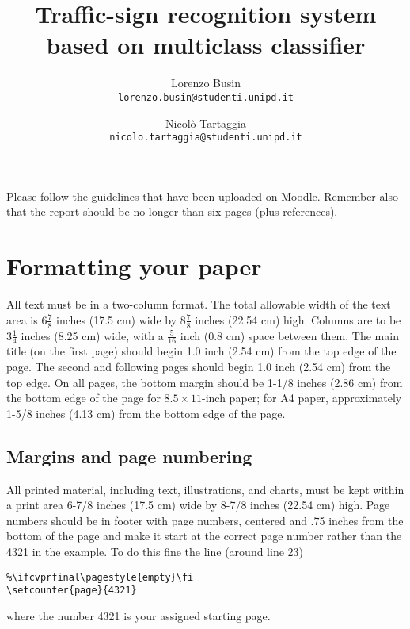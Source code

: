 \documentclass[10pt,twocolumn,letterpaper]{article}
\begin{document}
\title{Traffic-sign recognition system based on multiclass classifier}

\author{Lorenzo Busin\\
{\tt\small lorenzo.busin@studenti.unipd.it}
\and
Nicolò Tartaggia\\
{\tt\small nicolo.tartaggia@studenti.unipd.it}
}

\maketitle

\let\clearpage\relax


Please follow the guidelines that have been uploaded on Moodle. Remember also that the report should be no longer than six pages (plus references).

\section{Formatting your paper}

All text must be in a two-column format. The total allowable width of the
text area is $6\frac78$ inches (17.5 cm) wide by $8\frac78$ inches (22.54
cm) high. Columns are to be $3\frac14$ inches (8.25 cm) wide, with a
$\frac{5}{16}$ inch (0.8 cm) space between them. The main title (on the
first page) should begin 1.0 inch (2.54 cm) from the top edge of the
page. The second and following pages should begin 1.0 inch (2.54 cm) from
the top edge. On all pages, the bottom margin should be 1-1/8 inches (2.86
cm) from the bottom edge of the page for $8.5 \times 11$-inch paper; for A4
paper, approximately 1-5/8 inches (4.13 cm) from the bottom edge of the
page.

\subsection{Margins and page numbering}

All printed material, including text, illustrations, and charts, must be kept
within a print area 6-7/8 inches (17.5 cm) wide by 8-7/8 inches (22.54 cm)
high.
Page numbers should be in footer with page numbers, centered and .75
inches from the bottom of the page and make it start at the correct page
number rather than the 4321 in the example.  To do this fine the line (around
line 23)
\begin{verbatim}
%\ifcvprfinal\pagestyle{empty}\fi
\setcounter{page}{4321}
\end{verbatim}
where the number 4321 is your assigned starting page.
\end{document}
